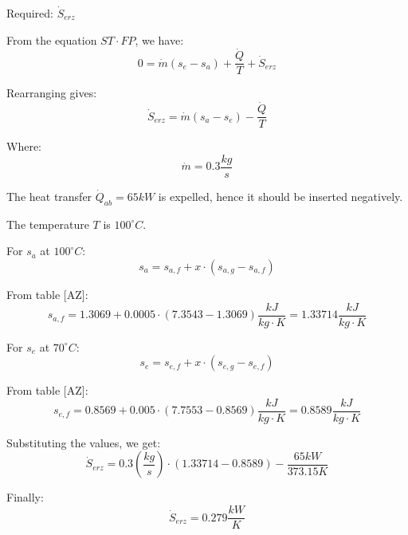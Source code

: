 Required: \( \dot{S}_{erz} \)

From the equation \( ST \cdot FP \), we have:
\[ 0 = \dot{m}(s_e - s_a) + \frac{\dot{Q}}{T} + \dot{S}_{erz} \]

Rearranging gives:
\[ \dot{S}_{erz} = \dot{m}(s_a - s_e) - \frac{\dot{Q}}{T} \]

Where:
\[ \dot{m} = 0.3 \frac{kg}{s} \]

The heat transfer \( \dot{Q}_{ab} = 65 kW \) is expelled, hence it should be inserted negatively.

The temperature \( T \) is \( 100^\circ C \).

For \( s_a \) at \( 100^\circ C \):
\[ s_a = s_{a,f} + x \cdot (s_{a,g} - s_{a,f}) \]

From table [AZ]:
\[ s_{a,f} = 1.3069 + 0.0005 \cdot (7.3543 - 1.3069) \frac{kJ}{kg \cdot K} = 1.33714 \frac{kJ}{kg \cdot K} \]

For \( s_e \) at \( 70^\circ C \):
\[ s_e = s_{e,f} + x \cdot (s_{e,g} - s_{e,f}) \]

From table [AZ]:
\[ s_{e,f} = 0.8569 + 0.005 \cdot (7.7553 - 0.8569) \frac{kJ}{kg \cdot K} = 0.8589 \frac{kJ}{kg \cdot K} \]

Substituting the values, we get:
\[ \dot{S}_{erz} = 0.3 \left( \frac{kg}{s} \right) \cdot (1.33714 - 0.8589) - \frac{65 kW}{373.15 K} \]

Finally:
\[ \dot{S}_{erz} = 0.279 \frac{kW}{K} \]